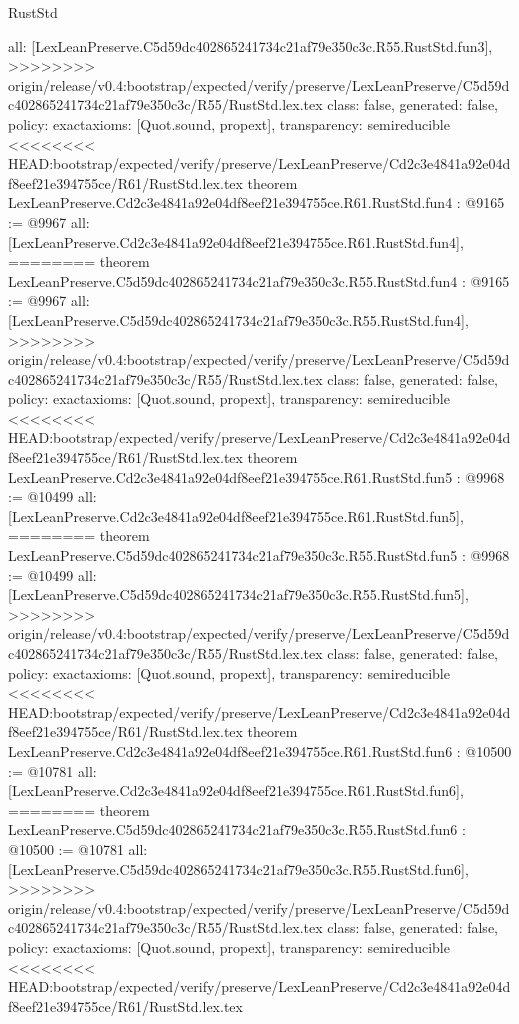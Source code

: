 \begin{lexlean}{RustStd}
\begin{coremodule}
{\begin{coremodule}
{{{{{{{  all: [LexLeanPreserve.C5d59dc402865241734c21af79e350c3c.R55.RustStd.fun3],
>>>>>>>> origin/release/v0.4:bootstrap/expected/verify/preserve/LexLeanPreserve/C5d59dc402865241734c21af79e350c3c/R55/RustStd.lex.tex
  class: false,
  generated: false,
  policy: exact{axioms: [Quot.sound, propext]},
  transparency: semireducible
}
<<<<<<<< HEAD:bootstrap/expected/verify/preserve/LexLeanPreserve/Cd2c3e4841a92e04df8eef21e394755ce/R61/RustStd.lex.tex
theorem LexLeanPreserve.Cd2c3e4841a92e04df8eef21e394755ce.R61.RustStd.fun4 : @9165 := @9967 {
  all: [LexLeanPreserve.Cd2c3e4841a92e04df8eef21e394755ce.R61.RustStd.fun4],
========
theorem LexLeanPreserve.C5d59dc402865241734c21af79e350c3c.R55.RustStd.fun4 : @9165 := @9967 {
  all: [LexLeanPreserve.C5d59dc402865241734c21af79e350c3c.R55.RustStd.fun4],
>>>>>>>> origin/release/v0.4:bootstrap/expected/verify/preserve/LexLeanPreserve/C5d59dc402865241734c21af79e350c3c/R55/RustStd.lex.tex
  class: false,
  generated: false,
  policy: exact{axioms: [Quot.sound, propext]},
  transparency: semireducible
}
<<<<<<<< HEAD:bootstrap/expected/verify/preserve/LexLeanPreserve/Cd2c3e4841a92e04df8eef21e394755ce/R61/RustStd.lex.tex
theorem LexLeanPreserve.Cd2c3e4841a92e04df8eef21e394755ce.R61.RustStd.fun5 : @9968 := @10499 {
  all: [LexLeanPreserve.Cd2c3e4841a92e04df8eef21e394755ce.R61.RustStd.fun5],
========
theorem LexLeanPreserve.C5d59dc402865241734c21af79e350c3c.R55.RustStd.fun5 : @9968 := @10499 {
  all: [LexLeanPreserve.C5d59dc402865241734c21af79e350c3c.R55.RustStd.fun5],
>>>>>>>> origin/release/v0.4:bootstrap/expected/verify/preserve/LexLeanPreserve/C5d59dc402865241734c21af79e350c3c/R55/RustStd.lex.tex
  class: false,
  generated: false,
  policy: exact{axioms: [Quot.sound, propext]},
  transparency: semireducible
}
<<<<<<<< HEAD:bootstrap/expected/verify/preserve/LexLeanPreserve/Cd2c3e4841a92e04df8eef21e394755ce/R61/RustStd.lex.tex
theorem LexLeanPreserve.Cd2c3e4841a92e04df8eef21e394755ce.R61.RustStd.fun6 : @10500 := @10781 {
  all: [LexLeanPreserve.Cd2c3e4841a92e04df8eef21e394755ce.R61.RustStd.fun6],
========
theorem LexLeanPreserve.C5d59dc402865241734c21af79e350c3c.R55.RustStd.fun6 : @10500 := @10781 {
  all: [LexLeanPreserve.C5d59dc402865241734c21af79e350c3c.R55.RustStd.fun6],
>>>>>>>> origin/release/v0.4:bootstrap/expected/verify/preserve/LexLeanPreserve/C5d59dc402865241734c21af79e350c3c/R55/RustStd.lex.tex
  class: false,
  generated: false,
  policy: exact{axioms: [Quot.sound, propext]},
  transparency: semireducible
}
<<<<<<<< HEAD:bootstrap/expected/verify/preserve/LexLeanPreserve/Cd2c3e4841a92e04df8eef21e394755ce/R61/RustStd.lex.tex
}}}}}}}}}
\end{coremodule}}
\end{coremodule}
\end{lexlean}
